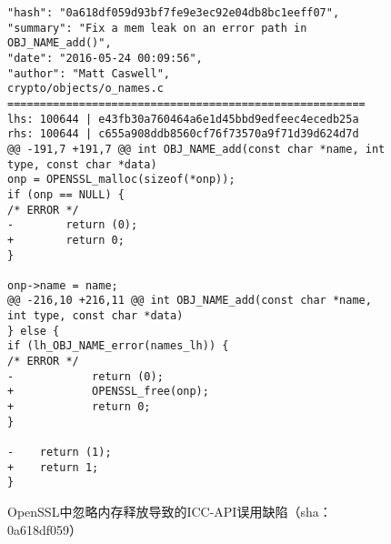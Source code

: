 \begin{figure}[b]
	\centering
\begin{lstlisting}
"hash": "0a618df059d93bf7fe9e3ec92e04db8bc1eeff07",
"summary": "Fix a mem leak on an error path in OBJ_NAME_add()",
"date": "2016-05-24 00:09:56",
"author": "Matt Caswell",
crypto/objects/o_names.c
=======================================================
lhs: 100644 | e43fb30a760464a6e1d45bbd9edfeec4ecedb25a
rhs: 100644 | c655a908ddb8560cf76f73570a9f71d39d624d7d
@@ -191,7 +191,7 @@ int OBJ_NAME_add(const char *name, int type, const char *data)
onp = OPENSSL_malloc(sizeof(*onp));
if (onp == NULL) {
/* ERROR */
-        return (0);
+        return 0;
}

onp->name = name;
@@ -216,10 +216,11 @@ int OBJ_NAME_add(const char *name, int type, const char *data)
} else {
if (lh_OBJ_NAME_error(names_lh)) {
/* ERROR */
-            return (0);
+            OPENSSL_free(onp);
+            return 0;
}

-    return (1);
+    return 1;
}

\end{lstlisting}
	\caption{
	OpenSSL中忽略内存释放导致的ICC-API误用缺陷（sha：0a618df059）
	}
	\label{fig:2-3-icc-1}
\end{figure}